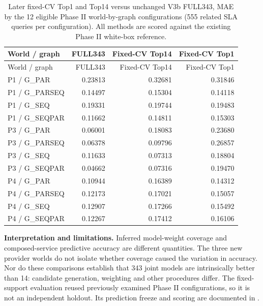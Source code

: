 \documentclass[10pt,a4paper]{article}
\begin{document}
\begingroup\footnotesize\setlength{\tabcolsep}{3pt}
\begin{longtable}{@{}p{}rrr@{}}
\caption{Later fixed-CV Top1 and Top14 versus unchanged V3b FULL343, MAE by the 12 eligible Phase II world-by-graph configurations (555 related SLA queries per configuration). All methods are scored against the existing Phase II white-box reference.}\label{tab:fixed-cv-m3-by-cell}\\
\toprule
World / graph & FULL343 & Fixed-CV Top14 & Fixed-CV Top1 \\
\midrule\endfirsthead
\toprule
World / graph & FULL343 & Fixed-CV Top14 & Fixed-CV Top1 \\
\midrule\endhead
P1 / G\_PAR & 0.23813 & 0.32681 & 0.31846 \\
P1 / G\_PARSEQ & 0.14497 & 0.15304 & 0.14118 \\
P1 / G\_SEQ & 0.19331 & 0.19744 & 0.19483 \\
P1 / G\_SEQPAR & 0.11662 & 0.14811 & 0.15303 \\
P3 / G\_PAR & 0.06001 & 0.18083 & 0.23680 \\
P3 / G\_PARSEQ & 0.06378 & 0.09796 & 0.26857 \\
P3 / G\_SEQ & 0.11633 & 0.07313 & 0.18804 \\
P3 / G\_SEQPAR & 0.04662 & 0.07316 & 0.19470 \\
P4 / G\_PAR & 0.10944 & 0.16389 & 0.14312 \\
P4 / G\_PARSEQ & 0.12173 & 0.17021 & 0.15057 \\
P4 / G\_SEQ & 0.12907 & 0.17266 & 0.15492 \\
P4 / G\_SEQPAR & 0.12267 & 0.17412 & 0.16106 \\
\bottomrule
\end{longtable}\endgroup

\textbf{Interpretation and limitations.} Inferred model-weight coverage and composed-service predictive accuracy are different quantities. The three new provider worlds do not isolate whether coverage caused the variation in accuracy. Nor do these comparisons establish that 343 joint models are intrinsically better than 14: candidate generation, weighting and other procedures differ. The fixed-support evaluation reused previously examined Phase II configurations, so it is not an independent holdout. Its prediction freeze and scoring are documented in .
\end{document}
